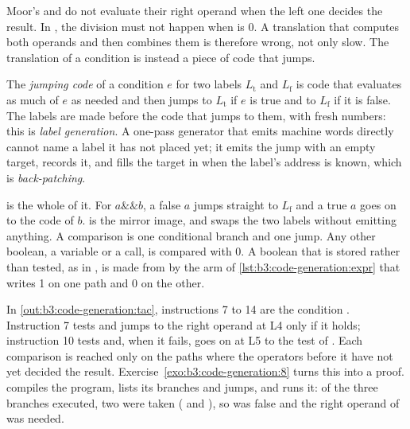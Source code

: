 Moor's \code{&&} and \code{||} do not evaluate their right operand when the left one decides the result. In , the division must not happen when  is 0. A translation that computes both operands and then combines them is therefore wrong, not only slow. The translation of a condition is instead a piece of code that jumps.

\begin{definition}\label{def:b3:code-generation:jumping}
The \emph{jumping code} of a condition $e$ for two labels $L_{\mathrm{t}}$ and $L_{\mathrm{f}}$ is code that evaluates as much of $e$ as needed and then jumps to $L_{\mathrm{t}}$ if $e$ is true and to $L_{\mathrm{f}}$ if it is false. The labels are made before the code that jumps to them, with fresh numbers: this is \emph{label generation}. A one-pass generator that emits machine words directly cannot name a label it has not placed yet; it emits the jump with an empty target, records it, and fills the target in when the label's address is known, which is \emph{back-patching}.
\end{definition}

 is the whole of it. For $a \mathbin{\&\&} b$, a false $a$ jumps straight to $L_{\mathrm{f}}$ and a true $a$ goes on to the code of $b$. \code{||} is the mirror image, and \code{!} swaps the two labels without emitting anything. A comparison is one conditional branch and one jump. Any other boolean, a variable or a call, is compared with 0. A boolean that is stored rather than tested, as in , is made from  by the arm of \cref{lst:b3:code-generation:expr} that writes 1 on one path and 0 on the other.

\label{lst:b3:code-generation:cond}

In \cref{out:b3:code-generation:tac}, instructions 7 to 14 are the condition . Instruction 7 tests  and jumps to the right operand at L4 only if it holds; instruction 10 tests  and, when it fails, goes on at L5 to the test of . Each comparison is reached only on the paths where the operators before it have not yet decided the result. Exercise~\ref{exo:b3:code-generation:8} turns this into a proof.  compiles the program, lists its branches and jumps, and runs it: of the three branches executed, two were taken ( and ), so  was false and the right operand of \code{||} was needed.

